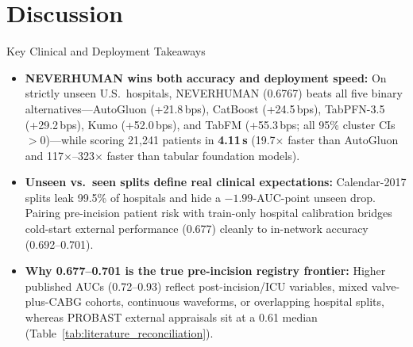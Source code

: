 \section{Discussion}

\begin{clinicalbox}{Key Clinical and Deployment Takeaways}
\begin{itemize}[leftmargin=1.15em,itemsep=1.8pt,topsep=1.5pt]
  \item \textbf{NEVERHUMAN wins both accuracy and deployment speed:} On strictly unseen U.S.\ hospitals, NEVERHUMAN (0.6767) beats all five binary alternatives---AutoGluon (+21.8\,bps), CatBoost (+24.5\,bps), TabPFN-3.5 (+29.2\,bps), Kumo (+52.0\,bps), and TabFM (+55.3\,bps; all 95\% cluster CIs $>0$)---while scoring 21,241 patients in \textbf{4.11\,s} (19.7$\times$ faster than AutoGluon and 117$\times$--323$\times$ faster than tabular foundation models).
  \item \textbf{Unseen vs.\ seen splits define real clinical expectations:} Calendar-2017 splits leak 99.5\% of hospitals and hide a $-1.99$-AUC-point unseen drop. Pairing pre-incision patient risk with train-only hospital calibration bridges cold-start external performance (0.677) cleanly to in-network accuracy (0.692--0.701).
  \item \textbf{Why 0.677--0.701 is the true pre-incision registry frontier:} Higher published AUCs (0.72--0.93) reflect post-incision/ICU variables, mixed valve-plus-CABG cohorts, continuous waveforms, or overlapping hospital splits, whereas PROBAST external appraisals sit at a 0.61 median (Table~\ref{tab:literature_reconciliation}).
\end{itemize}
\end{clinicalbox}

